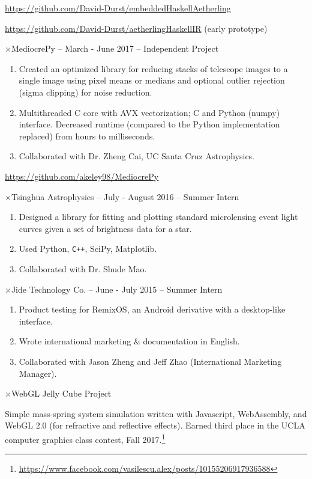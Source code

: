 \documentclass[11pt]{article}
\newcommand{\web}[1]{{ \color{webColor} \small \url{#1}}}
\newcommand{\myTitle}[1]{\vspace{2mm}{ \LARGE \color{titleColor} \textsf{#1}\vspace{2mm}}}
\newcommand{\mySub}[1]{{\color{subColor}$\times$\hspace{1mm}\textsf{#1}}}
\begin{document}
\web{https://github.com/David-Durst/embeddedHaskellAetherling}

\web{https://github.com/David-Durst/aetherlingHaskellIR} (early prototype)

\mySub{MediocrePy -- March - June 2017 -- Independent Project}
\begin{enumerate}
\item Created an optimized library for reducing stacks of telescope
  images to a single image using pixel means or medians and optional
  outlier rejection (sigma clipping) for noise reduction.
\item Multithreaded C core with AVX vectorization; C and Python
  (numpy) interface. Decreased runtime (compared to the Python
  implementation replaced) from hours to milliseconds.
\item Collaborated with Dr. Zheng Cai, UC Santa Cruz Astrophysics.
\end{enumerate}
\web{https://github.com/akeley98/MediocrePy}

\mySub{Tsinghua Astrophysics -- July - August 2016 -- Summer Intern}
\begin{enumerate}
\item Designed a library for fitting and plotting standard
  microlensing event light curves given a set of brightness
  data for a star.
\item Used Python, \texttt{C++}, SciPy, Matplotlib.
\item Collaborated with Dr. Shude Mao.
\end{enumerate}

\mySub{Jide Technology Co. -- June - July 2015 -- Summer Intern}
\begin{enumerate}
\item Product testing for RemixOS, an Android derivative with a
  desktop-like interface.

\item Wrote international marketing \& documentation in English.

\item Collaborated with Jason Zheng and Jeff Zhao (International
  Marketing Manager).
\end{enumerate}

\newpage
\myTitle{Other Projects}

\mySub{WebGL Jelly Cube Project}

Simple mass-spring system simulation written with Javascript,
WebAssembly, and WebGL 2.0 (for refractive and reflective effects).
Earned third place in the UCLA computer graphics class contest, Fall
2017.\footnote{
  \web{https://www.facebook.com/vasilescu.alex/posts/10155206917936588}}
\end{document}
